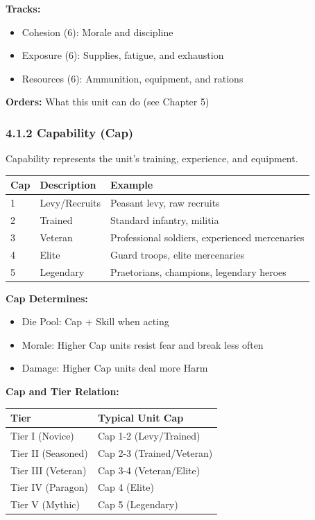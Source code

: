 \documentclass[11pt]{article}
\begin{document}
\textbf{Tracks:}
\begin{itemize}
  \item Cohesion (6): Morale and discipline
  \item Exposure (6): Supplies, fatigue, and exhaustion
  \item Resources (6): Ammunition, equipment, and rations
\end{itemize}

\textbf{Orders:} What this unit can do (see Chapter 5)

\subsubsection{4.1.2 Capability (Cap)}

Capability represents the unit's training, experience, and equipment.

\begin{tabular}{|l|l|l|}
\hline
Cap & Description & Example \\
\hline
1 & Levy/Recruits & Peasant levy, raw recruits \\
\hline
2 & Trained & Standard infantry, militia \\
\hline
3 & Veteran & Professional soldiers, experienced mercenaries \\
\hline
4 & Elite & Guard troops, elite mercenaries \\
\hline
5 & Legendary & Praetorians, champions, legendary heroes \\
\hline
\end{tabular}

\textbf{Cap Determines:}
\begin{itemize}
  \item Die Pool: Cap + Skill when acting
  \item Morale: Higher Cap units resist fear and break less often
  \item Damage: Higher Cap units deal more Harm
\end{itemize}

\textbf{Cap and Tier Relation:}
\begin{tabular}{|l|l|}
\hline
Tier & Typical Unit Cap \\
\hline
Tier I (Novice) & Cap 1-2 (Levy/Trained) \\
\hline
Tier II (Seasoned) & Cap 2-3 (Trained/Veteran) \\
\hline
Tier III (Veteran) & Cap 3-4 (Veteran/Elite) \\
\hline
Tier IV (Paragon) & Cap 4 (Elite) \\
\hline
Tier V (Mythic) & Cap 5 (Legendary) \\
\hline
\end{tabular}
\end{document}
